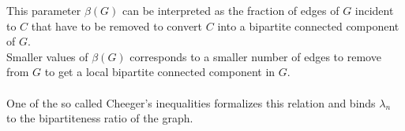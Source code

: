 This parameter $ \beta(G) $ can be interpreted as the fraction of edges of $ G $ incident to $ C $ that have to be removed to convert $ C $ into a bipartite connected component of $ G $.\\
Smaller values of $ \beta(G) $ corresponds to a smaller number of edges to remove from $ G $ to get a local bipartite connected component in $ G $. 
\\
\\
One of the so called Cheeger's inequalities formalizes this relation and binds $ \lambda_n $ to the bipartiteness ratio of the graph.
